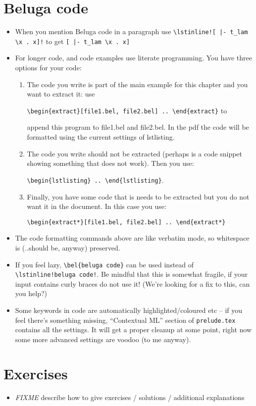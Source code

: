 \documentclass[12pt]{article}
\begin{document}
\section{Beluga code}
\begin{itemize}
\item When you mention Beluga code in a paragraph use
  \verb#\lstinline![ |- t_lam \x . x]!# to get \lstinline![ |- t_lam \x . x]!
\item For longer code, and code examples use literate programming. You have three options for your code:
  \begin{enumerate}
  \item The code you write is part of the main example for this
    chapter and you want to extract it: use

    \verb#\begin{extract}[file1.bel, file2.bel] .. \end{extract}# to

    append this program to file1.bel and file2.bel. In the pdf the
    code will be formatted using the current settings of lstlisting.
  \item The code you write should not be extracted (perhaps is a code
    snippet showing something that does not work). Then you use:

    \verb#\begin{lstlisting} .. \end{lstlisting}#.
  \item Finally, you have some code that is needs to be extracted but
    you do not want it in the document. In this case you use:

    \verb#\begin{extract*}[file1.bel, file2.bel] .. \end{extract*}#
  \end{enumerate}
\item The code formatting commands above are like verbatim mode, so whitespace is (..should be, anyway) preserved.
\item If you feel lazy, \verb#\bel{beluga code}# can be used instead of \\
  \verb#\lstinline!beluga code!#. Be mindful that this is somewhat
  fragile, if your input contains curly braces do not use it! (We're
  looking for a fix to this, can you help?)
\item Some keywords in \beluga code are automatically highlighted/coloured etc -- if you feel there's something missing, ``Contextual ML'' section of \verb#prelude.tex# contains all the settings. It will get a proper cleanup at some point, right now some more advanced settings are voodoo (to me anyway).
\end{itemize}

\section{Exercises}
\begin{itemize}
\item \emph{FIXME} describe how to give exercises / solutions / additional explanations
\end{itemize}
\end{document}
